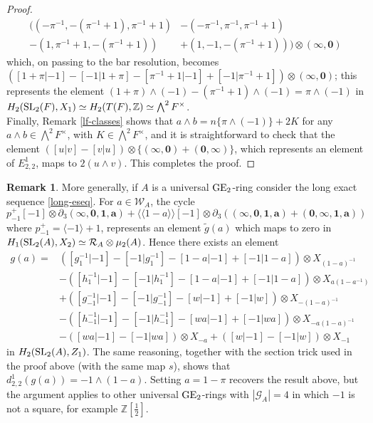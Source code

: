 \documentclass[11pt]{amsart}
\theoremstyle{definition}
\theoremstyle{plain}
\theoremstyle{definition}
\newtheorem{rem}[ntn]{Remark}
\numberwithin{equation}{section}
\newcommand{\z}{\mathbb{Z}}
\newcommand{\GG}{\mathcal{G}}
\newcommand{\RR}{\mathcal{R}}
\newcommand{\WW}{\mathcal{W}}
\newcommand{\half}{{\left[\frac{1}{2}\right]}}
\newcommand{\lan}{\langle}
\newcommand{\ran}{\rangle}
\newcommand{\Lan}{\langle \! \langle}
\newcommand{\Ran}{\rangle \! \rangle}
\newcommand{\GE}{{\rm GE}}
\newcommand{\SL}{\mathit{{\rm SL}}}
\begin{document}
\begin{proof}
		\begin{align*}
			((-\pi^{-1},-(\pi^{-1}+1),\pi^{-1}+1)&-(-\pi^{-1},\pi^{-1},\pi^{-1}+1)\\
			-(1,\pi^{-1}+1,-(\pi^{-1}+1))&+(1,-1,-(\pi^{-1}+1)))\otimes(\pmb{\infty},\pmb{0})
		\end{align*}
		which, on passing to the bar resolution, becomes $([1+\pi|-1]-[-1|1+\pi]-[\pi^{-1}+1|-1]+[-1|\pi^{-1}+1])\otimes(\pmb{\infty},\pmb{0})$; this represents the element $(1+\pi)\wedge(-1)-(\pi^{-1}+1)\wedge(-1)=\pi\wedge(-1)$ in $H_2(\SL_2(F),X_1)\simeq H_2(T(F),\z)\simeq\bigwedge^2F^{\times}$.\\
		
		Finally, Remark \ref{lf-classes} shows that $a\wedge b=n\{\pi\wedge(-1)\}+2K$ for any $a\wedge b\in\bigwedge^2 F^{\times}$, with $K\in\bigwedge^2F^{\times}$, and it is straightforward to check that the element $([u|v]-[v|u])\otimes\{(\pmb{\infty},\pmb{0})+(\pmb{0},\pmb{\infty})\}$, which represents an element of $E^1_{2,2}$, maps to $2(u\wedge v)$. This completes the proof.
	\end{proof} 
	\begin{rem}
		\label{rem-d211-gen}
		More generally, if $A$ is a universal $\GE_2$-ring consider the long exact sequence \eqref{long-eseq}. For $a\in\WW_A$, the cycle
		\[
		p_{-1}^+[-1]\otimes\partial_3(\pmb{\infty},\pmb{0},\pmb{1},\pmb{a})+\Lan1-a\Ran[-1]\otimes\partial_3((\pmb{\infty},\pmb{0},\pmb{1},\pmb{a})+(\pmb{0},\pmb{\infty},\pmb{1},\pmb{a}))
		\]
		where $p_{-1}^+=\lan -1\ran+1$, represents an element $\tilde{g}(a)$ which maps to zero in $H_1(\SL_2(A),X_2)\simeq\RR_A\otimes\mu_2(A)$. Hence there exists an element
		\begin{align*}
			g(a)=&([g_1^{-1}|-1]-[-1|g_1^{-1}]-[1-a|-1]+[-1|1-a])\otimes X_{(1-a)^{-1}}\\
			&-([h_1^{-1}|-1]-[-1|h_1^{-1}]-[1-a|-1]+[-1|1-a])\otimes X_{a(1-a^{-1})}\\
			&+([g_{-1}^{-1}|-1]-[-1|g_{-1}^{-1}]-[w|-1]+[-1|w])\otimes X_{-(1-a)^{-1}}\\
			&-([h_{-1}^{-1}|-1]-[-1|h_{-1}^{-1}]-[wa|-1]+[-1|wa])\otimes X_{-a(1-a)^{-1}}\\
			&-([wa|-1]-[-1|wa])\otimes X_{-a}+([w|-1]-[-1|w])\otimes X_{-1}
		\end{align*}
		in $H_2(\SL_2(A),Z_1)$. The same reasoning, together with the section trick used in the proof above (with the same map $s$), shows that $d^1_{2,2}(g(a))=-1\wedge (1-a)$. Setting $a=1-\pi$ recovers the result above, but the argument applies to other universal $\GE_2$-rings with $|\GG_A|=4$ in which $-1$ is not a square, for example $\z\half$.  
	\end{rem}
\end{document}
